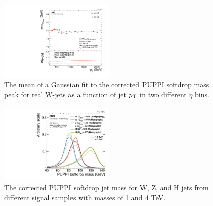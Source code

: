 \begin{figure}[h!]
\centering
\includegraphics[width=0.49\textwidth]{figures/analysis/search2/AN-16-235/plots/ClosureTest_RecoMass.pdf}
\caption{The mean of a Gaussian fit to the corrected PUPPI softdrop mass peak for real W-jets as a function of jet $p_{\mathrm{T}}$ in two different $\eta$ bins.}
\label{fig:searchII:wtagclosure}
\end{figure}
\begin{figure}[h!]
\centering
\includegraphics[width=0.49\textwidth]{figures/analysis/search2/AN-16-235/plots/SoftdropMass_NEWCORR_wH0.pdf}
\caption{The corrected PUPPI softdrop jet mass for W, Z, and H jets from different signal samples with masses of 1 and 4 TeV.}
\label{fig:search2:corrMass}
\end{figure}
\clearpage
